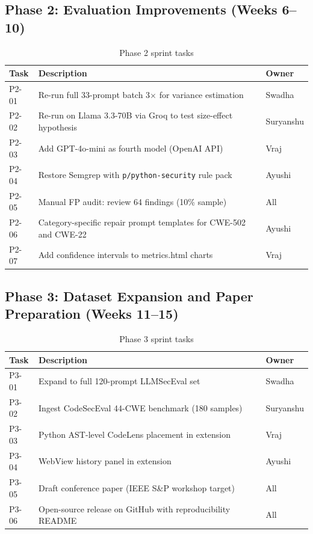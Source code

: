 \documentclass[12pt,a4paper]{report}
\begin{document}
\subsection{Phase 2: Evaluation Improvements (Weeks 6--10)}

\begin{table}[H]
\centering
\caption{Phase 2 sprint tasks}
\label{tab:phase2}
\renewcommand{\arraystretch}{1.3}
\begin{tabularx}{\textwidth}{@{}lXl@{}}
\toprule
\textbf{Task} & \textbf{Description} & \textbf{Owner} \\
\midrule
P2-01 & Re-run full 33-prompt batch 3$\times$ for variance estimation & Swadha \\
P2-02 & Re-run on Llama 3.3-70B via Groq to test size-effect hypothesis & Suryanshu \\
P2-03 & Add GPT-4o-mini as fourth model (OpenAI API) & Vraj \\
P2-04 & Restore Semgrep with \texttt{p/python-security} rule pack & Ayushi \\
P2-05 & Manual FP audit: review 64 findings (10\% sample) & All \\
P2-06 & Category-specific repair prompt templates for CWE-502 and CWE-22 & Ayushi \\
P2-07 & Add confidence intervals to metrics.html charts & Vraj \\
\bottomrule
\end{tabularx}
\end{table}

\subsection{Phase 3: Dataset Expansion and Paper Preparation (Weeks 11--15)}

\begin{table}[H]
\centering
\caption{Phase 3 sprint tasks}
\label{tab:phase3}
\renewcommand{\arraystretch}{1.3}
\begin{tabularx}{\textwidth}{@{}lXl@{}}
\toprule
\textbf{Task} & \textbf{Description} & \textbf{Owner} \\
\midrule
P3-01 & Expand to full 120-prompt LLMSecEval set & Swadha \\
P3-02 & Ingest CodeSecEval 44-CWE benchmark (180 samples) & Suryanshu \\
P3-03 & Python AST-level CodeLens placement in extension & Vraj \\
P3-04 & WebView history panel in extension & Ayushi \\
P3-05 & Draft conference paper (IEEE S\&P workshop target) & All \\
P3-06 & Open-source release on GitHub with reproducibility README & All \\
\bottomrule
\end{tabularx}
\end{table}
\end{document}
